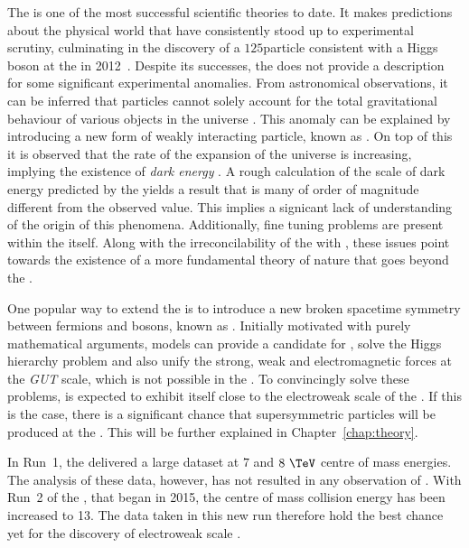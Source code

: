 The \SM is one of the most successful scientific theories to date. It
makes predictions about the physical world that have consistently
stood up to experimental scrutiny, culminating in the discovery of a
$125$\gev particle consistent with a Higgs boson at the \LHC in
2012~\cite{1207.7214,1207.7235}.  Despite its successes, the \SM does
not provide a description for some significant experimental anomalies.
From astronomical observations, it can be inferred that \SM particles
cannot solely account for the total gravitational behaviour of various
objects in the universe
\cite{Kapteyn:1922zz,Oort:436532,Markevitch:2003at,2012Natur.487..202D,Ade:2015xua,0067-0049-180-2-225}.
This anomaly can be explained by introducing a new form of weakly
interacting particle, known as \emph{\DM}. On top of this it is
observed that the rate of the expansion of the universe is increasing,
implying the existence of \emph{dark energy}
\cite{Weinberg:1988cp,Riess:1998cb}.  A rough calculation of the scale
of dark energy predicted by the \SM yields a result that is many of
order of magnitude different from the observed value.  This implies a
signicant lack of understanding of the origin of this phenomena.
Additionally, fine tuning problems are present within the \SM itself.
Along with the irreconcilability of the \SM with \GR, these issues
point towards the existence of a more fundamental theory of nature
that goes beyond the \SM. 

One popular way to extend the \SM is to introduce a new broken
spacetime symmetry between fermions and bosons, known as \SUSY
\cite{Martin:1997ns}.  Initially motivated with purely mathematical
arguments, \SUSY models can provide a candidate for \DM, solve the
Higgs hierarchy problem and also unify the strong, weak and
electromagnetic forces at the \emph{GUT} scale, which is not possible
in the \SM. To convincingly solve these problems, \SUSY is expected to
exhibit itself close to the electroweak scale of the \SM. If this is
the case, there is a significant chance that supersymmetric particles
will be produced at the \LHC. This will be further explained in
Chapter~\ref{chap:theory}. 

In Run~1, the \LHC delivered a large dataset at $7$ and $8~\tev$ centre
of mass energies. The analysis of these data, however, has not
resulted in any observation of \SUSY. With Run~2 of the
\LHC, that began in 2015, the centre of mass collision energy has been 
increased to 13\tev. The data taken in this new run therefore hold the
best chance yet for the discovery of electroweak scale \SUSY.


